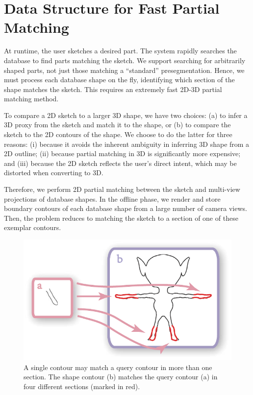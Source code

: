 \section{Data Structure for Fast Partial Matching}\label{sec:acc}

At runtime, the user sketches a desired part. The system rapidly searches the database to find parts matching the sketch. We support searching for arbitrarily shaped parts, not just those matching a ``standard'' presegmentation. Hence, we must process each database shape on the fly, identifying which section of the shape matches the sketch. This requires an extremely fast 2D-3D partial matching method.

To compare a 2D sketch to a larger 3D shape, we have two choices: (a) to infer a 3D proxy from the sketch \cite{Igarashi:1999:TSI:311535.311602} and match it to the shape, or (b) to compare the sketch to the 2D contours of the shape. We choose to do the latter for three reasons: (i) because it avoids the inherent ambiguity in inferring 3D shape from a 2D outline; (ii) because partial matching in 3D is significantly more expensive; and (iii) because the 2D sketch reflects the user's direct intent, which may be distorted when converting to 3D.

Therefore, we perform 2D partial matching between the sketch and multi-view projections of database shapes. In the offline phase, we render and store boundary contours of each database shape from a large number of camera views. Then, the problem reduces to matching the sketch to a section of one of these exemplar contours.

\begin{figure}[t]\centering
\includegraphics[width=0.85\linewidth]{./Material/CtourMatch.pdf}
\caption{A single contour may match a query contour in more than one section. The shape contour (b) matches the query contour (a) in four different sections (marked in red).}\label{fig:CtourMatch}
\end{figure}

